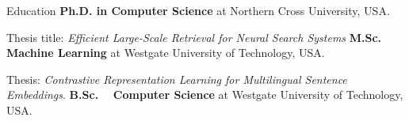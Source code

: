 \begin{rubric}{Education}
\entry*[2020 -- 2025 (expected)]%
	\textbf{Ph.D. in Computer Science} at Northern Cross University, USA.
	\par Thesis title: \emph{Efficient Large-Scale Retrieval for Neural Search Systems}
%
\entry*[2015 -- 2017]%
	\textbf{M.Sc. ~ Machine Learning} at Westgate University of Technology, USA.\par
	Thesis: \emph{Contrastive Representation Learning for Multilingual Sentence Embeddings}.
%
\entry*[2011 -- 2015]%
	\textbf{B.Sc. ~ Computer Science} at Westgate University of Technology, USA.\par

\end{rubric}
